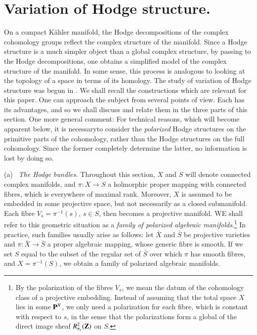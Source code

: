 \section{Variation of Hodge structure.}\label{art4-sec3}
On a compact K\"ahler manifold, the Hodge decompositions of the complex cohomology groups reflect the complex structure of the manifold. Since a Hodge structure is a much simpler object than a global complex structure, by passing to the Hodge decompositions, one obtains a simplified model of the complex structure of the manifold. In some sense, this process is analogous to looking at the topology of a space in terms of its homology. The study of variation of Hodge structure was begun in \cite{art4-key18,key19}. We shall recall the constructions which are relevant for this paper. One can approach the subject from several points of view. Each has its advantages, and so we shall discuss and relate them in the three parts of this section. One more general comment: For technical reasons, which will become apparent below, it is necessary\pageoriginale to consider the \textit{polarized} Hodge structures on the primitive parts of the cohomology, rather than the Hodge structures on the full cohomology. Since the former completely determine the latter, no information is lost by doing so.

\medskip
\noindent
(a)~ \textit{The Hodge bundles.} Throughout this section, $X$ and $S$  will denote connected complex manifolds, and $\pi : X \to S$ a holmorphic proper mapping with connected fibres, which is everywhere of maximal rank. Moreover, $X$ is assumed to be embedded in some projective space, but not necessarily as a closed submanifold. Each fibre $V_s = \pi^{-1} (s)$, $s \in S$, then becomes a projective manifold. WE shall refer to this geometric situation as a \textit{family of polarized algebraic manifolds}.\footnote[7]{By the polarization of the fibres $V_s$, we mean the datum of the cohomology class of a projective embedding. Instead of assuming that the total space $X$ lies in some $\mathbf{P}^N$, we only need a polarization for each fibre, which is constant with respect to $s$, in the sense that the polarizations form a global of the direct image sheaf $R^2_{\pi_\ast} (\mathbf{Z})$ on $S$.} In practice, such families usually arise as follows: let $\bar{X}$ and $\bar{S}$ be projective varieties and $\pi: \bar{X} \to \bar{S}$ a proper algebraic mapping, whose generic fibre is smooth. If we set $S$ equal to the subset of the regular set of $\bar{S}$ over which $\pi$ has smooth fibres, and $X= \pi^{-1} (S)$, we obtain a family of polarized algebraic manifolds.

